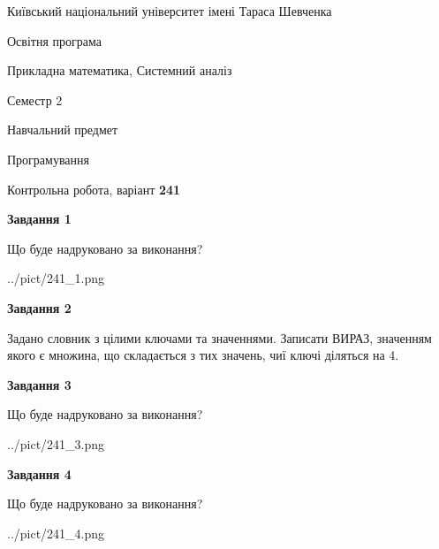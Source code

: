\documentclass[12pt, ukrainian]{article}
\begin{document}
{{\begin {small}\par
{ \center  Київський національний університет імені Тараса Шевченка \par}
{\parbox {5 cm}{Освітня програма \hfill}{\parbox {8 cm}{Прикладна математика, Системний аналіз \hfill}}\parbox {5 cm}{\hfill Семестр 2}}\par
{\parbox {5 cm} {Навчальний предмет \hfill}\parbox {7 cm}{Програмування \hfill}\parbox {6cm}{\hfill}\par}\vspace{-7pt} \end{small}}{\center Контрольна робота, варіант  \No \textbf
{ 241 }\par}}
{
\begin {large}
{\begin {center}\textbf{Завдання 1}\end {center}}\par
Що буде надруковано за виконання?\par\par
\begin{center}
	{../pict/241_1.png}
\end{center}
\newpage

{\begin {center}\textbf{Завдання 2}\end {center}}\par
Задано словник  з цілими ключами та значеннями. Записати ВИРАЗ, значенням якого є множина, що складається  з тих значень, чиї ключі діляться на 4.\par
\newpage

{\begin {center}\textbf{Завдання 3}\end {center}}\par
Що буде надруковано за виконання?
\begin{center}
	{../pict/241_3.png}
\end{center}
\newpage

{\begin {center}\textbf{Завдання 4}\end {center}}\par
Що буде надруковано за виконання?\par
\begin{center}
	{../pict/241_4.png}
\end{center}
\newpage


\end{large}}
\end{document}
